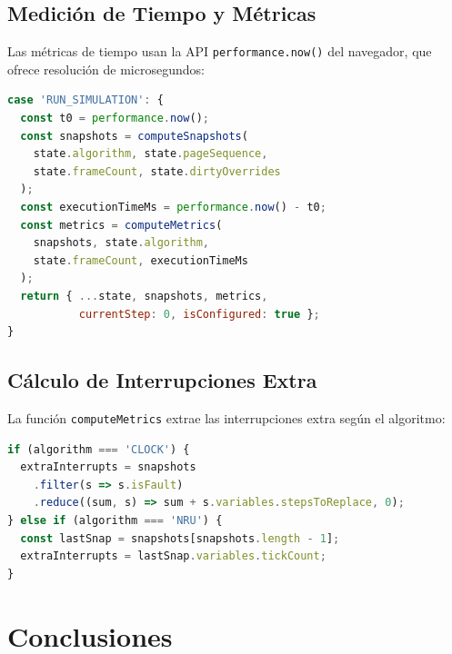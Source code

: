 \documentclass[12pt, a4paper]{article}
\begin{document}
\subsection{Medición de Tiempo y Métricas}

Las métricas de tiempo usan la API \texttt{performance.now()} del navegador, que ofrece resolución de microsegundos:

\begin{lstlisting}[language=JavaScript, caption={Medición de tiempo de cómputo en el reducer}]
case 'RUN_SIMULATION': {
  const t0 = performance.now();
  const snapshots = computeSnapshots(
    state.algorithm, state.pageSequence,
    state.frameCount, state.dirtyOverrides
  );
  const executionTimeMs = performance.now() - t0;
  const metrics = computeMetrics(
    snapshots, state.algorithm,
    state.frameCount, executionTimeMs
  );
  return { ...state, snapshots, metrics,
           currentStep: 0, isConfigured: true };
}
\end{lstlisting}

\subsection{Cálculo de Interrupciones Extra}

La función \texttt{computeMetrics} extrae las interrupciones extra según el algoritmo:

\begin{lstlisting}[language=JavaScript, caption={Cálculo de interrupciones extra por algoritmo}]
if (algorithm === 'CLOCK') {
  extraInterrupts = snapshots
    .filter(s => s.isFault)
    .reduce((sum, s) => sum + s.variables.stepsToReplace, 0);
} else if (algorithm === 'NRU') {
  const lastSnap = snapshots[snapshots.length - 1];
  extraInterrupts = lastSnap.variables.tickCount;
}
\end{lstlisting}

\section{Conclusiones}
\end{document}
